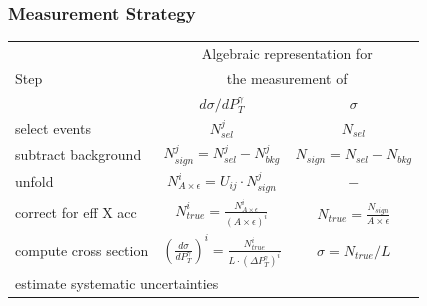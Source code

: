 \begin{frame}\frametitle{Measurement Strategy}
  \scriptsize
\begin{table}[h]
  \scriptsize
  \begin{center}
  \begin{tabular}{|l|c|c|}
    \hline
          & \multicolumn{2}{|c|}{Algebraic representation for} \\ 
     Step & \multicolumn{2}{|c|}{the measurement of} \\ 
          & $d\sigma/dP_{T}^{\gamma}$ & $\sigma$ \\ \hline
    select events & {\bfseries{$N_{sel}^j$}} &    {\bfseries{$N_{sel}$}}       \\ \hline
    subtract background & {\bfseries{$N_{sign}^j = N_{sel}^j - N_{bkg}^j$}} &    {\bfseries{$N_{sign}=N_{sel}-N_{bkg}$}}       \\ \hline
    unfold   & $N_{A\times\epsilon}^i = U_{ij} \cdot N_{sign}^j$ &    $-$       \\ \hline
    correct for eff X acc & $N_{true}^i = \frac{N_{A\times\epsilon}^i}{(A \times\epsilon)^i}$ &  $N_{true}=\frac{N_{sign}}{A\times\epsilon}$       \\ \hline
    compute cross section & $ \left( \frac{d\sigma}{dP_{T}^\gamma} \right) ^i = \frac{N_{true}^i}{L \cdot (\Delta P_T^\gamma)^i}$  &  $\sigma = N_{true}/L$       \\ \hline
    \multicolumn{3}{|l|}{estimate systematic uncertainties}          \\ \hline
  \end{tabular}
  \label{tab:analysisOutline}
  \end{center}
\end{table}
\end{frame}%
